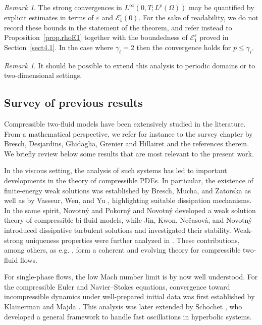 \documentclass[11pt, twoside, a4paper]{article}
\theoremstyle{plain}
\theoremstyle{remark}
\newtheorem{remark}[theorem]{Remark}
\numberwithin{equation}{section}
\def\EE{{\mathcal E}}
\renewcommand{\leq}{\leqslant}\renewcommand{\le}{\leqslant}
\newcommand{\eps}{\varepsilon}
\begin{document}
\begin{remark}
The strong convergences in $L^\infty(0,T; L^p(\Omega))$ may be quantified by explicit estimates in terms of $\eps$ and $\EE_1^\eps(0)$. For the sake of readability, we do not record these bounds in the statement of the theorem, and refer instead to Proposition~\ref{prop.rhoE1} together with the boundedness of $\EE_1^\eps$ proved in Section~\ref{sect4.1}. In the case where $\gamma_i=2$ then the convergence holds for $p\leq \gamma_i$.
\end{remark}

\begin{remark}
It should be possible to extend this analysis to periodic domains or to two-dimensional settings.
\end{remark}


\subsection{Survey of previous results}\label{survey}


Compressible two-fluid models have been extensively studied in the literature. From a mathematical perspective, we refer for instance to the survey chapter by Bresch, Desjardins, Ghidaglia, Grenier and Hillairet \cite{bresch2018multi} and the references therein. We briefly review below some results that are most relevant to the present work.

In the viscous setting, the analysis of such systems has led to important developments in the theory of compressible PDEs. In particular, the existence of finite-energy weak solutions was established by Bresch, Mucha, and Zatorska \cite{bresch2019finite} as well as by Vasseur, Wen, and Yu \cite{vasseur2019global}, highlighting suitable dissipation mechanisms. In the same spirit, Novotný and Pokorný \cite{novotny2020weak} and Novotný \cite{novotny2020weak1} developed a weak solution theory of compressible bi-fluid models, while Jin, Kwon, Nečasová, and Novotný \cite{jin2021existence} introduced dissipative turbulent solutions and investigated their stability. Weak-strong uniqueness properties were further analyzed in \cite{jin2019weak,li2026weak,li2021remarks}. 
These contributions, among others, as e.g. \cite{li2025non,li2020large,piasecki2022maximal}, form a coherent and evolving theory for compressible two-fluid flows.


For single-phase flows, the low Mach number limit is by now well understood. For the compressible Euler and Navier–Stokes equations, convergence toward incompressible dynamics under well-prepared initial data was first established by Klainerman and Majda \cite{klainerman1981singular, klainerman1982compressible}. This analysis was later extended by Schochet \cite{schochet1994fast}, who developed a general framework to handle fast oscillations in hyperbolic systems.
\end{document}
